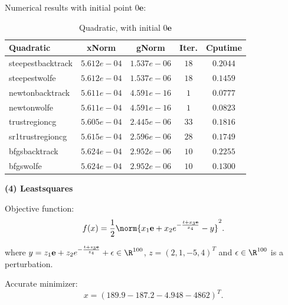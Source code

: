 \documentclass[11pt]{report}
\begin{document}
Numerical results with initial point $0\mathbf{e}$:
\begin{table}[htpb]
    \caption{Quadratic, with initial $0\mathbf{e}$}
    \label{tab:Quadratic_initial}
    \begin{center}
        \begin{tabular}{l|cccc}
\textbf{Quadratic}           &   \textbf{xNorm}     &\textbf{gNorm}     & \textbf{Iter.}&  \textbf{Cputime}   \\
\hline
steepestbacktrack   &   $5.612e-04 $&   $1.537e-06 $&   $18   $&    $0.2044    $    \\
steepestwolfe       &   $5.612e-04 $&   $1.537e-06 $&   $18   $&    $0.1459    $    \\
newtonbacktrack     &   $5.611e-04 $&   $4.591e-16 $&   $1    $&    $0.0777    $    \\
newtonwolfe         &   $5.611e-04 $&   $4.591e-16 $&   $1    $&    $0.0823    $    \\
trustregioncg       &   $5.605e-04 $&   $2.445e-06 $&   $33   $&    $0.1816    $    \\
sr1trustregioncg    &   $5.615e-04 $&   $2.596e-06 $&   $28   $&    $0.1749    $    \\
bfgsbacktrack       &   $5.624e-04 $&   $2.952e-06 $&   $10   $&    $0.2255    $    \\
bfgswolfe           &   $5.624e-04 $&   $2.952e-06 $&   $10   $&    $0.1300    $    \\
 \end{tabular}
    \end{center}
\end{table}

\textbf{(4) Leastsquares }

Objective function: 
\begin{equation}
    f(x) = \frac{1}{2}\norm{x_1\mathbf{e}+x_2e^{-\frac{t+x_3\mathbf{e}}{x_4}}-y}^2.
\end{equation}

where $y=z_1\mathbf{e}+z_2e^{-\frac{t+z_3\mathbf{e}}{z_4}} + \epsilon\in \R^{100}$, $z=(2,1,-5,4)^T$ and $\epsilon\in \R^{100}$ is a perturbation.

Accurate minimizer:
\begin{equation}
   x = (189.9  -187.2  -4.948  -4862)^T.
\end{equation}
\end{document}
